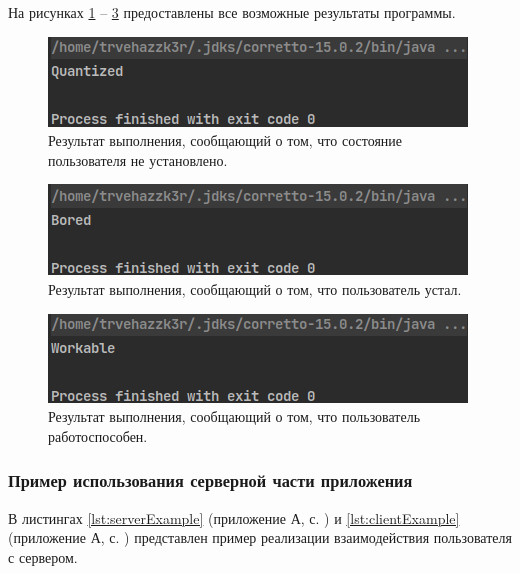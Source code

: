 На рисунках \ref{fig:analyzeExample0} -- \ref{fig:analyzeExample2} предоставлены все возможные результаты программы.

\begin{figure}[H]
	\centering
	\includegraphics[width=\textwidth]{img/analyzeExample0.png}
	\caption{Результат выполнения, сообщающий о том, что состояние пользователя не установлено.}
	\label{fig:analyzeExample0}
\end{figure}

\begin{figure}[H]
	\centering
	\includegraphics[width=\textwidth]{img/analyzeExample1.png}
	\caption{Результат выполнения, сообщающий о том, что пользователь устал.}
	\label{fig:analyzeExample1}
\end{figure}

\begin{figure}[H]
	\centering
	\includegraphics[width=\textwidth]{img/analyzeExample2.png}
	\caption{Результат выполнения, сообщающий о том, что пользователь работоспособен.}
	\label{fig:analyzeExample2}
\end{figure}

\subsubsection{Пример использования серверной части приложения}

В листингах \ref{lst:serverExample} (приложение А, с. \pageref{chp:application-a}) и \ref{lst:clientExample} (приложение А, с. \pageref{chp:application-a}) представлен пример реализации взаимодействия пользователя с сервером.

